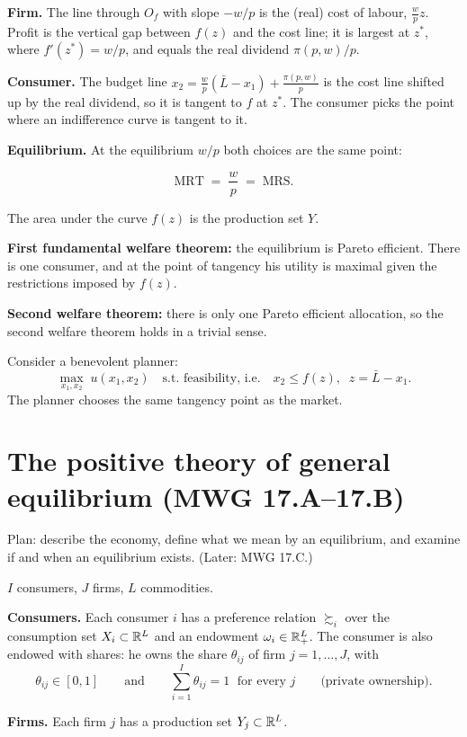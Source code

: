 \documentclass[11pt]{article}
\begin{document}
\begin{flatlist}
  \item \textbf{Firm.} The line through $O_f$ with slope $-w/p$ is the (real) cost of
        labour, $\frac wp z$. Profit is the vertical gap between $f(z)$ and the cost line;
        it is largest at $z^*$, where $f'(z^*)=w/p$, and equals the real dividend
        $\pi(p,w)/p$.
  \item \textbf{Consumer.} The budget line $x_2=\frac wp(\bar L-x_1)+\frac{\pi(p,w)}{p}$ is
        the cost line shifted up by the real dividend, so it is tangent to $f$ at $z^*$. The
        consumer picks the point where an indifference curve is tangent to it.
  \item \textbf{Equilibrium.} At the equilibrium $w/p$ both choices are the same point:
\end{flatlist}
\[ \text{MRT} \;=\; \frac wp \;=\; \text{MRS}. \]

The area under the curve $f(z)$ is the production set $Y$.

\begin{flatlist}
  \item \textbf{First fundamental welfare theorem:} the equilibrium is Pareto efficient.
        There is one consumer, and at the point of tangency his utility is maximal given the
        restrictions imposed by $f(z)$.
  \item \textbf{Second welfare theorem:} there is only one Pareto efficient allocation, so
        the second welfare theorem holds in a trivial sense.
\end{flatlist}

Consider a benevolent planner:
\[ \max_{x_1,x_2}\; u(x_1,x_2) \quad\text{s.t. feasibility, i.e.}\quad
   x_2\le f(z),\;\; z=\bar L-x_1 . \]
The planner chooses the same tangency point as the market.


\section{The positive theory of general equilibrium (MWG 17.A--17.B)}

Plan: describe the economy, define what we mean by an equilibrium, and examine if and when
an equilibrium exists. (Later: MWG 17.C.)

$I$ consumers, $J$ firms, $L$ commodities.

\begin{flatlist}
  \item \textbf{Consumers.} Each consumer $i$ has a preference relation $\succsim_i$ over
        the consumption set $X_i\subset\mathbb{R}^L$ and an endowment $\omega_i\in\mathbb{R}^L_+$. The
        consumer is also endowed with shares: he owns the share $\theta_{ij}$ of firm
        $j=1,\dots,J$, with
        \[ \theta_{ij}\in[0,1] \qquad\text{and}\qquad \sum_{i=1}^{I}\theta_{ij}=1
           \;\text{ for every } j \qquad\text{(private ownership).} \]
  \item \textbf{Firms.} Each firm $j$ has a production set $Y_j\subset\mathbb{R}^L$.
\end{flatlist}
\end{document}
